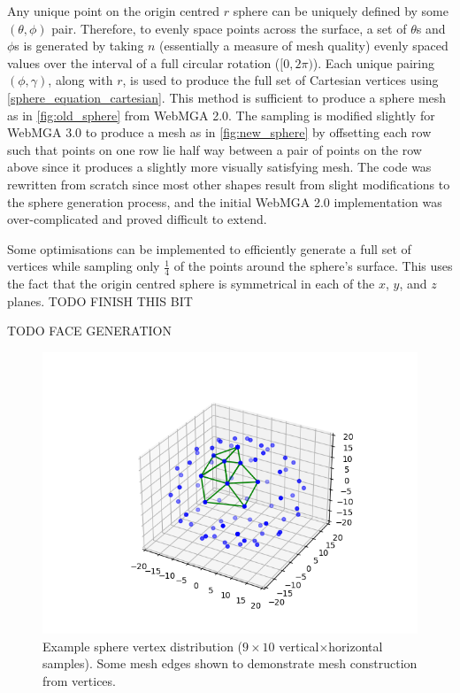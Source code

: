 Any unique point on the origin centred $r$ sphere can be uniquely defined by some $(\theta,\phi)$ pair. Therefore, to evenly space points across the surface, a set of $\theta$s and $\phi$s is generated by taking $n$ (essentially a measure of mesh quality) evenly spaced values over the interval of a full circular rotation ($[0, 2\pi)$). Each unique pairing $(\phi,\gamma)$, along with $r$, is used to produce the full set of Cartesian vertices using \cref{sphere_equation_cartesian}. This method is sufficient to produce a sphere mesh as in \cref{fig:old_sphere} from WebMGA 2.0. The sampling is modified slightly for WebMGA 3.0 to produce a mesh as in \cref{fig:new_sphere} by offsetting each row such that points on one row lie half way between a pair of points on the row above since it produces a slightly more visually satisfying mesh. The code was rewritten from scratch since most other shapes result from slight modifications to the sphere generation process, and the initial WebMGA 2.0 implementation was over-complicated and proved difficult to extend.

Some optimisations can be implemented to efficiently generate a full set of vertices while sampling only $\frac{1}{4}$ of the points around the sphere's surface. This uses the fact that the origin centred sphere is symmetrical in each of the $x$, $y$, and $z$ planes. TODO FINISH THIS BIT

TODO FACE GENERATION

\begin{figure}
  \begin{center}
    \includegraphics[width=0.5\linewidth]{assets/images/shapes/sphere_vertices}
    \caption{Example sphere vertex distribution ($9\times10$ vertical$\times$horizontal samples). Some mesh edges shown to demonstrate mesh construction from vertices.}
    \label{fig:sphere_vertices}
  \end{center}
\end{figure}


